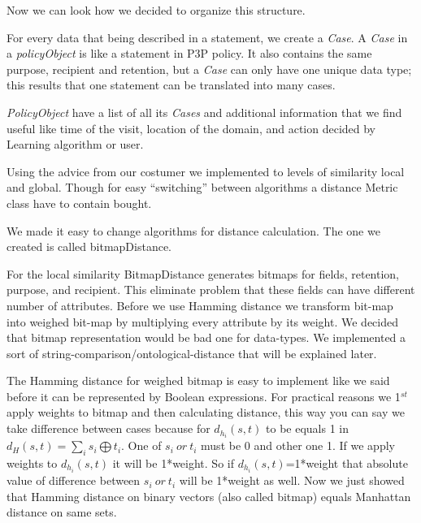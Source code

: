 \documentclass{article}
\begin{document}
\noindent Now we can look how we decided to organize this structure. 

\noindent 

\noindent For every data that being described in a statement, we create a \textit{Case}. A \textit{Case} in a\textit{ policyObject} is like a statement in P3P policy. It also contains the same purpose, recipient and retention, but a \textit{Case }can only have one unique data type; this results that one statement can be translated into many cases.

\noindent 

\noindent \textit{PolicyObject }have a list of all its \textit{Cases} and additional information that we find useful like time of the visit, location of the domain, and action decided by Learning algorithm or user.

\noindent 

\noindent Using the advice from our costumer we implemented to levels of similarity local and global. Though for easy ``switching'' between algorithms a distance Metric class have to contain bought.

\noindent 

\noindent We made it easy to change algorithms for distance calculation. The one we created is called bitmapDistance. 

\noindent 

\noindent For the local similarity BitmapDistance generates bitmaps for fields, retention, purpose, and recipient. This eliminate problem that these fields can have different number of attributes.  Before we use Hamming distance we transform bit-map into weighed bit-map by multiplying every attribute by its weight. We decided that bitmap representation would be bad one for data-types. We implemented a sort of string-comparison/ontological-distance that will be explained later. 

\noindent The Hamming distance for weighed bitmap is easy to implement like we said before it can be represented by Boolean expressions. For practical reasons we 1${}^{st}$ apply weights to bitmap and then calculating distance, this way you can say we take difference between cases because for $d_{h_i}\left(s,t\right)$ to be equals 1 in $d_H\left(s,t\right)=\sum_i{s_i\bigoplus t_i}$. One of $s_i\ or\ t_i$ must be 0 and other one 1. If we apply weights to $d_{h_i}\left(s,t\right)$ it will be 1*weight. So if $d_{h_i}\left(s,t\right)$=1*weight that absolute value of difference between $s_i\ or\ t_i$ will be 1*weight as well. Now we just showed that Hamming distance on binary vectors (also called bitmap) equals Manhattan distance on same sets.
\end{document}
